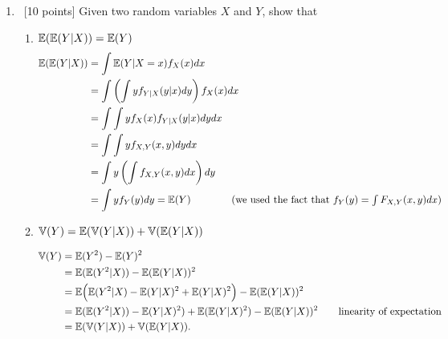 \documentclass[12pt, fullpage,letterpaper]{article}
\def\blackblue{\color{black!40!blue}}
\begin{document}
\begin{enumerate}
\item~[10 points]  Given two random variables $X$ and $Y$, show that 
\begin{enumerate}
\item $\mathbb{E}(\mathbb{E}(Y|X)) = \mathbb{E}(Y)$
{\blackblue\noindent 
\begin{align*}
\mathbb{E}(\mathbb{E}(Y|X)) 
& = \int \mathbb{E}(Y|X=x)f_X(x)dx \\
& = \int \left(\int yf_{Y|X}(y|x)dy\right)f_X(x)dx \\
& = \int \int yf_X(x)f_{Y|X}(y|x)dydx \\
& = \int \int yf_{X,Y}(x,y)dydx \\
& = \int y\left(\int f_{X,Y}(x,y)dx\right)dy \\
& = \int yf_Y(y)dy = \mathbb{E}(Y) \qquad\qquad \mbox{(we used the fact that $f_Y(y) = \int F_{X,Y}(x,y)dx$)}
\end{align*}}
\item
$\mathbb{V}(Y) = \mathbb{E}(\mathbb{V}(Y|X)) + \mathbb{V}(\mathbb{E}(Y|X))$

{\blackblue\noindent 
\begin{align*}
\mathbb{V}(Y) & = \mathbb{E}(Y^2) - \mathbb{E}(Y)^2\\\
& = \mathbb{E}(\mathbb{E}(Y^2|X)) - \mathbb{E}(\mathbb{E}(Y|X))^2\\
& = \mathbb{E}\Big(\mathbb{E}(Y^2|X)-\mathbb{E}(Y|X)^2+\mathbb{E}(Y|X)^2\Big) - \mathbb{E}(\mathbb{E}(Y|X))^2\\
& = \mathbb{E}(\mathbb{E}(Y^2|X))-\mathbb{E}(Y|X)^2) +\mathbb{E}(\mathbb{E}(Y|X)^2) - \mathbb{E}(\mathbb{E}(Y|X))^2 \qquad \mbox{linearity of expectation} \\
& =\mathbb{E}(\mathbb{V}(Y|X)) + \mathbb{V}(\mathbb{E}(Y|X)).
\end{align*}}
\end{enumerate}



\end{enumerate}
\end{document}
